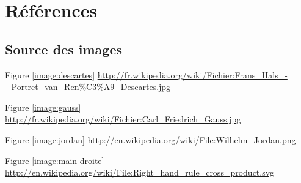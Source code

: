 \chapter{Références}
\setlength{\parindent}{0pt}

\section{Source des images}
\small
Figure \ref{image:descartes} \url{http://fr.wikipedia.org/wiki/Fichier:Frans_Hals_-_Portret_van_Ren%C3%A9_Descartes.jpg} \smallskip

Figure \ref{image:gauss} \url{http://fr.wikipedia.org/wiki/Fichier:Carl_Friedrich_Gauss.jpg}\smallskip

Figure \ref{image:jordan} \url{http://en.wikipedia.org/wiki/File:Wilhelm_Jordan.png}\smallskip

Figure \ref{image:main-droite} \url{http://en.wikipedia.org/wiki/File:Right_hand_rule_cross_product.svg}\smallskip